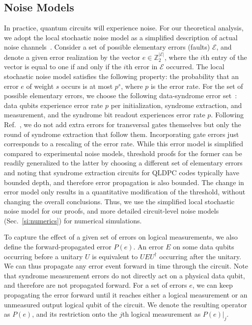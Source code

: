 \subsection{Noise Models}
In practice, quantum circuits will experience noise.
%
For our theoretical analysis, we adopt the local stochastic noise model as a simplified description of actual noise channels~\cite{gottesman2013fault}.
%
Consider a set of possible elementary errors (faults) $\mathcal{E}$, and denote a given error realization by the vector $e\in \mathbb{Z}_2^{|\mathcal{E}|}$, where the $i$th entry of the vector is equal to one if and only if the $i$th error in $\mathcal{E}$ occurred.
%
The local stochastic noise model satisfies the following property: the probability that an error $e$ of weight $s$ occurs is at most $p^{s}$, where $p$ is the error rate.
%
For the set of possible elementary errors, we choose the following data-syndrome error set~\cite{gottesman2013fault}: data qubits experience error rate $p$ per initialization, syndrome extraction, and measurement, and the syndrome bit readout experiences error rate $p$.
%
Following Ref.~\cite{gottesman2013fault}, we do not add extra errors for transversal gates themselves but only the round of syndrome extraction that follow them.
%
Incorporating gate errors just corresponds to a rescaling of the error rate.
%
While this error model is simplified compared to experimental noise models, threshold proofs for the former can be readily generalized to the latter by choosing a different set of elementary errors and noting that syndrome extraction circuits for QLDPC codes typically have bounded depth, and therefore error propagation is also bounded.
%
The change in error model only results in a quantitative modification of the threshold, without changing the overall conclusions.
%
Thus, we use the simplified local stochastic noise model for our proofs, and more detailed circuit-level noise models (Sec.~\ref{si:numerics}) for numerical simulations.

To capture the effect of a given set of errors on logical measurements, we also define the forward-propagated error $P(e)$.
%
An error $E$ on some data qubits occurring before a unitary $U$ is equivalent to $UEU^\dagger$ occurring after the unitary.
%
We can thus propagate any error event forward in time through the circuit.
%
Note that syndrome measurement errors do not directly act on a physical data qubit, and therefore are not propagated forward.
%
For a set of errors $e$, we can keep propagating the error forward until it reaches either a logical measurement or an unmeasured output logical qubit of the circuit.
%
We denote the resulting operator as $P(e)$, and its restriction onto the $j$th logical measurement as $P(e)|_j$.


